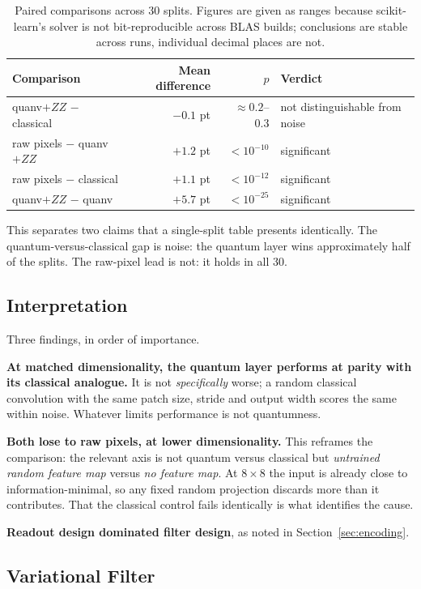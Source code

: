 \documentclass[11pt,a4paper]{article}
\begin{document}
\begin{table}[h]
\centering
\caption{Paired comparisons across 30 splits. Figures are given as ranges because
scikit-learn's solver is not bit-reproducible across BLAS builds; conclusions are
stable across runs, individual decimal places are not.}
\small
\begin{tabular}{@{}lrrl@{}}
\toprule
Comparison & Mean difference & $p$ & Verdict \\
\midrule
quanv$+ZZ$ $-$ classical & $-0.1$ pt & $\approx 0.2$--$0.3$ & not distinguishable from noise \\
raw pixels $-$ quanv$+ZZ$ & $+1.2$ pt & $< 10^{-10}$ & significant \\
raw pixels $-$ classical & $+1.1$ pt & $< 10^{-12}$ & significant \\
quanv$+ZZ$ $-$ quanv & $+5.7$ pt & $< 10^{-25}$ & significant \\
\bottomrule
\end{tabular}
\end{table}

This separates two claims that a single-split table presents identically. The
quantum-versus-classical gap is noise: the quantum layer wins approximately half
of the splits. The raw-pixel lead is not: it holds in all 30.

\subsection{Interpretation}

Three findings, in order of importance.

\textbf{At matched dimensionality, the quantum layer performs at parity with its
classical analogue.} It is not \emph{specifically} worse; a random classical
convolution with the same patch size, stride and output width scores the same
within noise. Whatever limits performance is not quantumness.

\textbf{Both lose to raw pixels, at lower dimensionality.} This reframes the
comparison: the relevant axis is not quantum versus classical but \emph{untrained
random feature map} versus \emph{no feature map}. At $8\times8$ the input is
already close to information-minimal, so any fixed random projection discards
more than it contributes. That the classical control fails identically is what
identifies the cause.

\textbf{Readout design dominated filter design}, as noted in
Section~\ref{sec:encoding}.

\subsection{Variational Filter}
\label{sec:variational}
\end{document}
